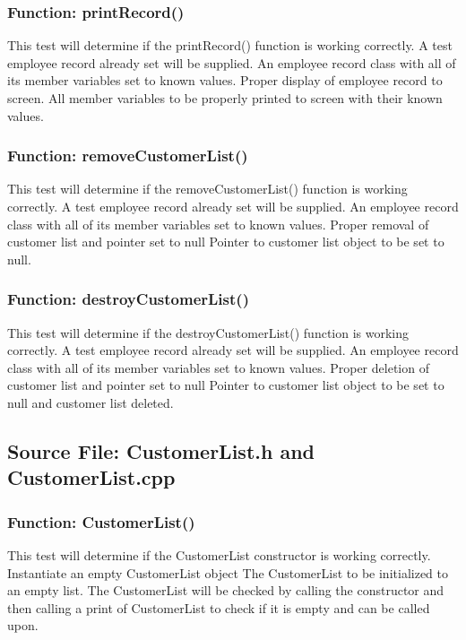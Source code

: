 \documentclass[12pt]{article}%
\newcounter{subsubsubsection}[subsubsection]
\begin{document}
\subsubsection{Function: printRecord()}
This test will determine if the printRecord() function is working correctly. A test
employee record already set will be supplied.
An employee record class with all of its member variables set to known values.
Proper display of employee record to screen.
All member variables to be properly printed to screen with their known values.

\subsubsection{Function: removeCustomerList()}
This test will determine if the removeCustomerList() function is working correctly. A test
employee record already set will be supplied.
An employee record class with all of its member variables set to known values.
Proper removal of customer list and pointer set to null
Pointer to customer list object to be set to null.

\subsubsection{Function: destroyCustomerList()}
This test will determine if the destroyCustomerList() function is working correctly. A test
employee record already set will be supplied.
An employee record class with all of its member variables set to known values.
Proper deletion of customer list and pointer set to null
Pointer to customer list object to be set to null and customer list deleted.

\subsection{Source File: CustomerList.h and CustomerList.cpp}
\subsubsection{Function: CustomerList()}
This test will determine if the CustomerList constructor is working correctly.
Instantiate an empty CustomerList object
The CustomerList to be initialized to an empty list.
The CustomerList will be checked by calling the constructor and then calling a print of CustomerList
to check if it is empty and can be called upon.
\end{document}
